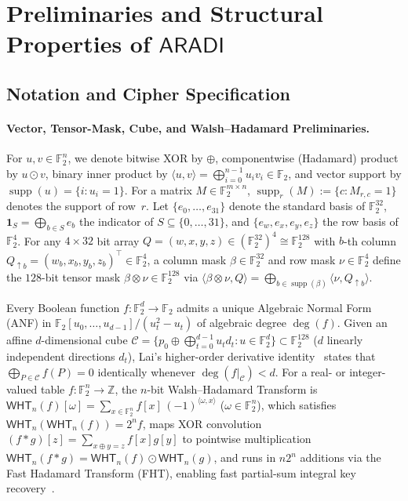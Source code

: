 \documentclass[11pt,a4paper]{article}
\theoremstyle{definition}
\theoremstyle{remark}
\newcommand{\Ftwo}{\mathbb{F}_2}
\newcommand{\ARADI}{\mathsf{ARADI}}
\newcommand{\supp}{\operatorname{supp}}
\begin{document}
\section{Preliminaries and Structural Properties of \texorpdfstring{$\ARADI$}{ARADI}}
\label{sec:spec}

\subsection{Notation and Cipher Specification}
\label{subsec:prelim}

\paragraph{Vector, Tensor-Mask, Cube, and Walsh--Hadamard Preliminaries.}
For $u, v \in \Ftwo^n$, we denote bitwise XOR by $\oplus$, componentwise (Hadamard) product by $u \odot v$, binary inner product by $\langle u, v \rangle = \bigoplus_{i=0}^{n-1} u_i v_i \in \Ftwo$, and vector support by $\supp(u) = \{i : u_i = 1\}$. For a matrix $M \in \Ftwo^{m \times n}$, $\supp_r(M) := \{c : M_{r,c} = 1\}$ denotes the support of row~$r$. Let $\{e_0, \dots, e_{31}\}$ denote the standard basis of $\Ftwo^{32}$, $\mathbf{1}_S = \bigoplus_{b \in S} e_b$ the indicator of $S \subseteq \{0,\dots,31\}$, and $\{e_w, e_x, e_y, e_z\}$ the row basis of $\Ftwo^4$. For any $4 \times 32$ bit array $Q = (w, x, y, z) \in (\Ftwo^{32})^4 \cong \Ftwo^{128}$ with $b$-th column $Q_{\uparrow b} = (w_b, x_b, y_b, z_b)^\top \in \Ftwo^4$, a column mask $\beta \in \Ftwo^{32}$ and row mask $\nu \in \Ftwo^4$ define the $128$-bit tensor mask $\beta \otimes \nu \in \Ftwo^{128}$ via $\langle \beta \otimes \nu, Q \rangle = \bigoplus_{b \in \supp(\beta)} \langle \nu, Q_{\uparrow b} \rangle$.

Every Boolean function $f: \Ftwo^d \to \Ftwo$ admits a unique Algebraic Normal Form (ANF) in $\Ftwo[u_0,\dots,u_{d-1}]/(u_t^2 - u_t)$ of algebraic degree $\deg(f)$. Given an affine $d$-dimensional cube $\mathcal{C} = \{p_0 \oplus \bigoplus_{t=0}^{d-1} u_t d_t : u \in \Ftwo^d\} \subset \Ftwo^{128}$ ($d$ linearly independent directions $d_t$), Lai's higher-order derivative identity~\cite{Lai94,KW02} states that $\bigoplus_{P \in \mathcal{C}} f(P) = 0$ identically whenever $\deg(f|_{\mathcal{C}}) < d$. For a real- or integer-valued table $f: \Ftwo^n \to \mathbb{Z}$, the $n$-bit Walsh--Hadamard Transform is $\mathsf{WHT}_n(f)[\omega] = \sum_{x \in \Ftwo^n} f[x]\,(-1)^{\langle \omega, x\rangle}$ ($\omega \in \Ftwo^n$), which satisfies $\mathsf{WHT}_n(\mathsf{WHT}_n(f)) = 2^n f$, maps XOR convolution $(f * g)[z] = \sum_{x \oplus y = z} f[x]g[y]$ to pointwise multiplication $\mathsf{WHT}_n(f * g) = \mathsf{WHT}_n(f) \odot \mathsf{WHT}_n(g)$, and runs in $n 2^n$ additions via the Fast Hadamard Transform (FHT), enabling fast partial-sum integral key recovery~\cite{CSQ07,TA14,DGK24,DG25}.
\end{document}
